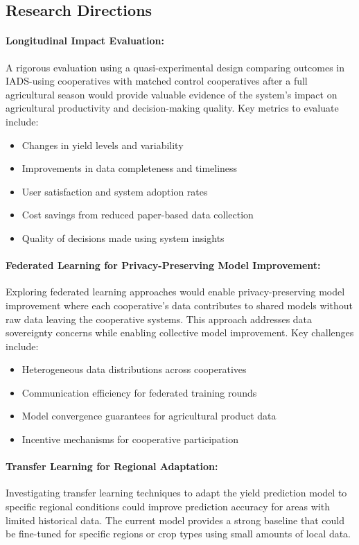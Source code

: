 \subsection{Research Directions}

\paragraph{Longitudinal Impact Evaluation:}
A rigorous evaluation using a quasi-experimental design comparing outcomes in IADS-using cooperatives with matched control cooperatives after a full agricultural season would provide valuable evidence of the system's impact on agricultural productivity and decision-making quality. Key metrics to evaluate include:
\begin{itemize}
  \item Changes in yield levels and variability
  \item Improvements in data completeness and timeliness
  \item User satisfaction and system adoption rates
  \item Cost savings from reduced paper-based data collection
  \item Quality of decisions made using system insights
\end{itemize}

\paragraph{Federated Learning for Privacy-Preserving Model Improvement:}
Exploring federated learning approaches would enable privacy-preserving model improvement where each cooperative's data contributes to shared models without raw data leaving the cooperative systems. This approach addresses data sovereignty concerns while enabling collective model improvement. Key challenges include:
\begin{itemize}
  \item Heterogeneous data distributions across cooperatives
  \item Communication efficiency for federated training rounds
  \item Model convergence guarantees for agricultural product data 
  \item Incentive mechanisms for cooperative participation
\end{itemize}

\paragraph{Transfer Learning for Regional Adaptation:}
Investigating transfer learning techniques to adapt the yield prediction model to specific regional conditions could improve prediction accuracy for areas with limited historical data. The current model provides a strong baseline that could be fine-tuned for specific regions or crop types using small amounts of local data.

